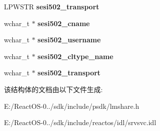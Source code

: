 \begin{DoxyCompactItemize}
\mbox{\label{struct___s_e_s_s_i_o_n___i_n_f_o__502_a265cdbcf9df768e176589a5531310472}} 
L\+P\+W\+S\+TR {\bfseries sesi502\+\_\+transport}
\item 
\mbox{\label{struct___s_e_s_s_i_o_n___i_n_f_o__502_ab869edfd1663b65ebf840e6a57a6e75d}} 
wchar\+\_\+t $\ast$ {\bfseries sesi502\+\_\+cname}
\item 
\mbox{\label{struct___s_e_s_s_i_o_n___i_n_f_o__502_a26ff7377fa455247c5599dfce2c8f488}} 
wchar\+\_\+t $\ast$ {\bfseries sesi502\+\_\+username}
\item 
\mbox{\label{struct___s_e_s_s_i_o_n___i_n_f_o__502_a7aef6ca8296fddbea6f8d46dbd338863}} 
wchar\+\_\+t $\ast$ {\bfseries sesi502\+\_\+cltype\+\_\+name}
\item 
\mbox{\label{struct___s_e_s_s_i_o_n___i_n_f_o__502_a3e6abac35c50b5e513608696ac120124}} 
wchar\+\_\+t $\ast$ {\bfseries sesi502\+\_\+transport}
\end{DoxyCompactItemize}


该结构体的文档由以下文件生成\+:\begin{DoxyCompactItemize}
\item 
E\+:/\+React\+O\+S-\/0../sdk/include/psdk/lmshare.\+h\item 
E\+:/\+React\+O\+S-\/0../sdk/include/reactos/idl/srvsvc.\+idl\end{DoxyCompactItemize}

